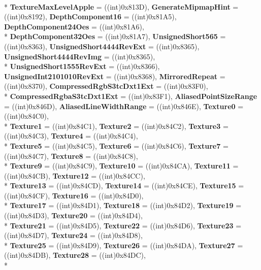 \begin{DoxyCompactItemize}
\\*
{\bfseries Texture\-Max\-Level\-Apple} = ((int)0x813\-D), 
{\bfseries Generate\-Mipmap\-Hint} = ((int)0x8192), 
{\bfseries Depth\-Component16} = ((int)0x81\-A5), 
{\bfseries Depth\-Component24\-Oes} = ((int)0x81\-A6), 
\\*
{\bfseries Depth\-Component32\-Oes} = ((int)0x81\-A7), 
{\bfseries Unsigned\-Short565} = ((int)0x8363), 
{\bfseries Unsigned\-Short4444\-Rev\-Ext} = ((int)0x8365), 
{\bfseries Unsigned\-Short4444\-Rev\-Img} = ((int)0x8365), 
\\*
{\bfseries Unsigned\-Short1555\-Rev\-Ext} = ((int)0x8366), 
{\bfseries Unsigned\-Int2101010\-Rev\-Ext} = ((int)0x8368), 
{\bfseries Mirrored\-Repeat} = ((int)0x8370), 
{\bfseries Compressed\-Rgb\-S3tc\-Dxt1\-Ext} = ((int)0x83\-F0), 
\\*
{\bfseries Compressed\-Rgba\-S3tc\-Dxt1\-Ext} = ((int)0x83\-F1), 
{\bfseries Aliased\-Point\-Size\-Range} = ((int)0x846\-D), 
{\bfseries Aliased\-Line\-Width\-Range} = ((int)0x846\-E), 
{\bfseries Texture0} = ((int)0x84\-C0), 
\\*
{\bfseries Texture1} = ((int)0x84\-C1), 
{\bfseries Texture2} = ((int)0x84\-C2), 
{\bfseries Texture3} = ((int)0x84\-C3), 
{\bfseries Texture4} = ((int)0x84\-C4), 
\\*
{\bfseries Texture5} = ((int)0x84\-C5), 
{\bfseries Texture6} = ((int)0x84\-C6), 
{\bfseries Texture7} = ((int)0x84\-C7), 
{\bfseries Texture8} = ((int)0x84\-C8), 
\\*
{\bfseries Texture9} = ((int)0x84\-C9), 
{\bfseries Texture10} = ((int)0x84\-C\-A), 
{\bfseries Texture11} = ((int)0x84\-C\-B), 
{\bfseries Texture12} = ((int)0x84\-C\-C), 
\\*
{\bfseries Texture13} = ((int)0x84\-C\-D), 
{\bfseries Texture14} = ((int)0x84\-C\-E), 
{\bfseries Texture15} = ((int)0x84\-C\-F), 
{\bfseries Texture16} = ((int)0x84\-D0), 
\\*
{\bfseries Texture17} = ((int)0x84\-D1), 
{\bfseries Texture18} = ((int)0x84\-D2), 
{\bfseries Texture19} = ((int)0x84\-D3), 
{\bfseries Texture20} = ((int)0x84\-D4), 
\\*
{\bfseries Texture21} = ((int)0x84\-D5), 
{\bfseries Texture22} = ((int)0x84\-D6), 
{\bfseries Texture23} = ((int)0x84\-D7), 
{\bfseries Texture24} = ((int)0x84\-D8), 
\\*
{\bfseries Texture25} = ((int)0x84\-D9), 
{\bfseries Texture26} = ((int)0x84\-D\-A), 
{\bfseries Texture27} = ((int)0x84\-D\-B), 
{\bfseries Texture28} = ((int)0x84\-D\-C), 
\\*

\end{DoxyCompactItemize}
